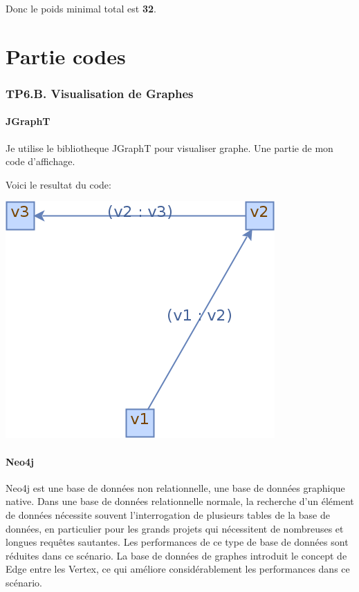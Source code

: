 \documentclass[12pt]{fphw}
\begin{document}
Donc le poids minimal total est \textbf{32}.

\newpage
\part*{Partie codes}

\section*{TP6.B. Visualisation de Graphes}
\subsection*{JGraphT}
Je utilise le bibliotheque JGraphT pour visualiser graphe. Une partie de mon code d'affichage.



\newpage

Voici le resultat du code:\\
\begin{center}
	\includegraphics[width=0.6\columnwidth]{graph.png} %
\end{center}

\subsection*{Neo4j}
Neo4j est une base de données non relationnelle, une base de données graphique native. Dans une base de données relationnelle normale, la recherche d'un élément de données nécessite souvent l'interrogation de plusieurs tables de la base de données, en particulier pour les grands projets qui nécessitent de nombreuses et longues requêtes sautantes. Les performances de ce type de base de données sont réduites dans ce scénario. La base de données de graphes introduit le concept de Edge entre les Vertex, ce qui améliore considérablement les performances dans ce scénario.\\
\end{document}
